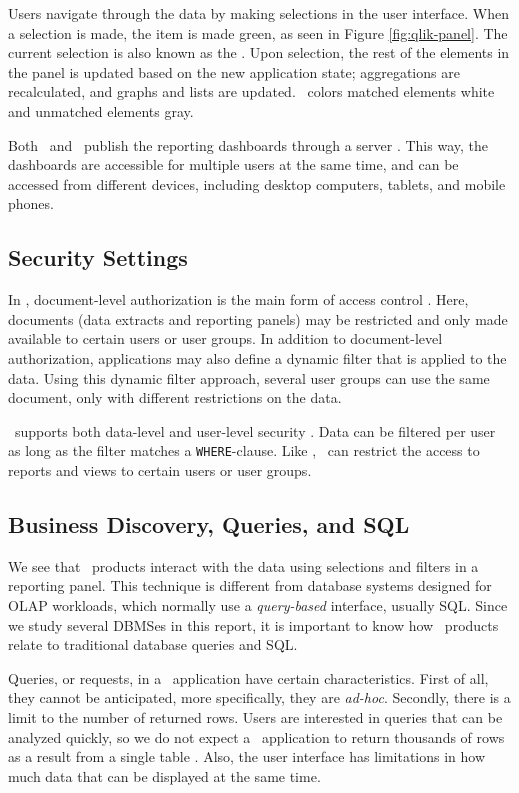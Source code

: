 Users navigate through the data by making selections in the user interface. When a selection is made, the item is made green, as seen in Figure \ref{fig:qlik-panel}. The current selection is also known as the . Upon selection, the rest of the elements in the panel is updated based on the new application state; aggregations are recalculated, and graphs and lists are updated. \qlikview~colors matched elements white and unmatched elements gray.

Both \qlikview~and \tableau~publish the reporting dashboards through a server \cite{Kamkolkar2015-iq, Qlik2011-ef}. This way, the dashboards are accessible for multiple users at the same time, and can be accessed from different devices, including desktop computers, tablets, and mobile phones.

\subsection{Security Settings}
\label{sub:Security Settings}
In \qlikview, document-level authorization is the main form of access control \cite{Qlik2011-hj}. Here, documents (data extracts and reporting panels) may be restricted and only made available to certain users or user groups. In addition to document-level authorization, applications may also define a dynamic filter that is applied to the data. Using this dynamic filter approach, several user groups can use the same document, only with different restrictions on the data.

\tableau~supports both data-level and user-level security \cite{Kamkolkar2015-iq}. Data can be filtered per user as long as the filter matches a \texttt{WHERE}-clause. Like \qlikview, \tableau~can restrict the access to reports and views to certain users or user groups.

\subsection{Business Discovery, Queries, and SQL}
\label{sub:Business Discovery, Queries, and SQL}
We see that \bd~products interact with the data using selections and filters in a reporting panel. This technique is different from database systems designed for OLAP workloads, which normally use a \textit{query-based} interface, usually SQL. Since we study several DBMSes in this report, it is important to know how \bd~products relate to traditional database queries and SQL.

Queries, or requests, in a \bd~application have certain characteristics. First of all, they cannot be anticipated, more specifically, they are \textit{ad-hoc}. Secondly, there is a limit to the number of returned rows. Users are interested in queries that can be analyzed quickly, so we do not expect a \bd~application to return thousands of rows as a result from a single table \cite{Ferrari2012-hm}. Also, the user interface has limitations in how much data that can be displayed at the same time. 

